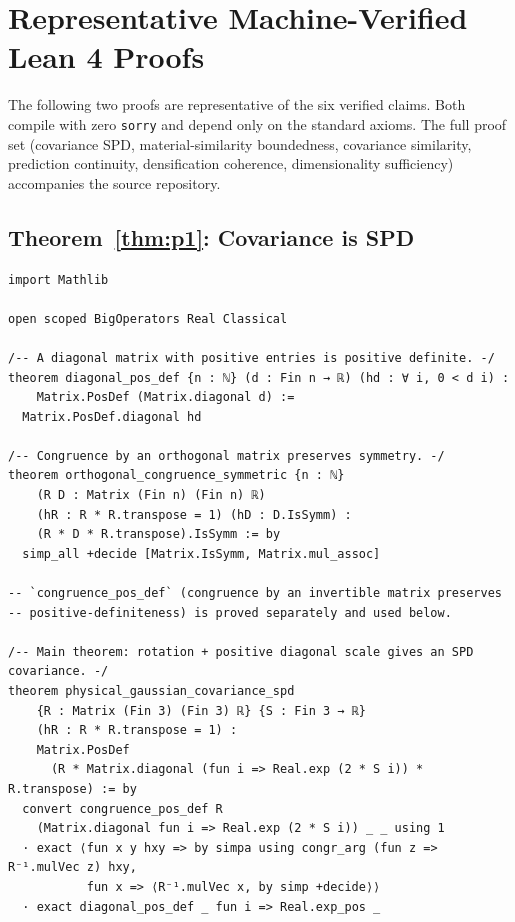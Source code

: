 \documentclass[twoside,11pt]{article}
\begin{document}
\appendix

\section{Representative Machine-Verified Lean 4 Proofs}
\label{app:lean}

The following two proofs are representative of the six verified claims. Both compile with zero \texttt{sorry} and depend only on the standard axioms. The full proof set (covariance SPD, material-similarity boundedness, covariance similarity, prediction continuity, densification coherence, dimensionality sufficiency) accompanies the source repository.

\subsection{Theorem~\ref{thm:p1}: Covariance is SPD}

\begin{lstlisting}
import Mathlib

open scoped BigOperators Real Classical

/-- A diagonal matrix with positive entries is positive definite. -/
theorem diagonal_pos_def {n : ℕ} (d : Fin n → ℝ) (hd : ∀ i, 0 < d i) :
    Matrix.PosDef (Matrix.diagonal d) :=
  Matrix.PosDef.diagonal hd

/-- Congruence by an orthogonal matrix preserves symmetry. -/
theorem orthogonal_congruence_symmetric {n : ℕ}
    (R D : Matrix (Fin n) (Fin n) ℝ)
    (hR : R * R.transpose = 1) (hD : D.IsSymm) :
    (R * D * R.transpose).IsSymm := by
  simp_all +decide [Matrix.IsSymm, Matrix.mul_assoc]

-- `congruence_pos_def` (congruence by an invertible matrix preserves
-- positive-definiteness) is proved separately and used below.

/-- Main theorem: rotation + positive diagonal scale gives an SPD covariance. -/
theorem physical_gaussian_covariance_spd
    {R : Matrix (Fin 3) (Fin 3) ℝ} {S : Fin 3 → ℝ}
    (hR : R * R.transpose = 1) :
    Matrix.PosDef
      (R * Matrix.diagonal (fun i => Real.exp (2 * S i)) * R.transpose) := by
  convert congruence_pos_def R
    (Matrix.diagonal fun i => Real.exp (2 * S i)) _ _ using 1
  · exact ⟨fun x y hxy => by simpa using congr_arg (fun z => R⁻¹.mulVec z) hxy,
           fun x => ⟨R⁻¹.mulVec x, by simp +decide⟩⟩
  · exact diagonal_pos_def _ fun i => Real.exp_pos _
\end{lstlisting}
\end{document}
